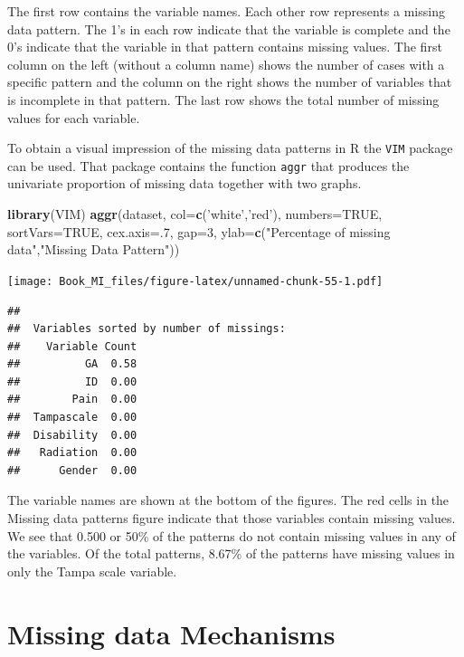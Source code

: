\documentclass[]{book}
\newenvironment{Shaded}{\begin{snugshade}}{\end{snugshade}}
\newcommand{\KeywordTok}[1]{\textcolor[rgb]{0.13,0.29,0.53}{\textbf{#1}}}
\newcommand{\DataTypeTok}[1]{\textcolor[rgb]{0.13,0.29,0.53}{#1}}
\newcommand{\DecValTok}[1]{\textcolor[rgb]{0.00,0.00,0.81}{#1}}
\newcommand{\StringTok}[1]{\textcolor[rgb]{0.31,0.60,0.02}{#1}}
\newcommand{\OtherTok}[1]{\textcolor[rgb]{0.56,0.35,0.01}{#1}}
\newcommand{\NormalTok}[1]{#1}
\begin{document}
The first row contains the variable names. Each other row represents a
missing data pattern. The 1's in each row indicate that the variable is
complete and the 0's indicate that the variable in that pattern contains
missing values. The first column on the left (without a column name)
shows the number of cases with a specific pattern and the column on the
right shows the number of variables that is incomplete in that pattern.
The last row shows the total number of missing values for each variable.

To obtain a visual impression of the missing data patterns in R the
\texttt{VIM} package can be used. That package contains the function
\texttt{aggr} that produces the univariate proportion of missing data
together with two graphs.

\begin{Shaded}
\begin{Highlighting}[]
\KeywordTok{library}\NormalTok{(VIM)}
\KeywordTok{aggr}\NormalTok{(dataset, }\DataTypeTok{col=}\KeywordTok{c}\NormalTok{(}\StringTok{'white'}\NormalTok{,}\StringTok{'red'}\NormalTok{), }\DataTypeTok{numbers=}\OtherTok{TRUE}\NormalTok{, }\DataTypeTok{sortVars=}\OtherTok{TRUE}\NormalTok{, }\DataTypeTok{cex.axis=}\NormalTok{.}\DecValTok{7}\NormalTok{, }\DataTypeTok{gap=}\DecValTok{3}\NormalTok{, }\DataTypeTok{ylab=}\KeywordTok{c}\NormalTok{(}\StringTok{"Percentage of missing data"}\NormalTok{,}\StringTok{"Missing Data Pattern"}\NormalTok{))}
\end{Highlighting}
\end{Shaded}

\texttt{[image: Book\_MI\_files/figure-latex/unnamed-chunk-55-1.pdf]}

\begin{verbatim}
## 
##  Variables sorted by number of missings: 
##    Variable Count
##          GA  0.58
##          ID  0.00
##        Pain  0.00
##  Tampascale  0.00
##  Disability  0.00
##   Radiation  0.00
##      Gender  0.00
\end{verbatim}

The variable names are shown at the bottom of the figures. The red cells
in the Missing data patterns figure indicate that those variables
contain missing values. We see that 0.500 or 50\% of the patterns do not
contain missing values in any of the variables. Of the total patterns,
8.67\% of the patterns have missing values in only the Tampa scale
variable.

\section{Missing data Mechanisms}\label{missing-data-mechanisms}
\end{document}
